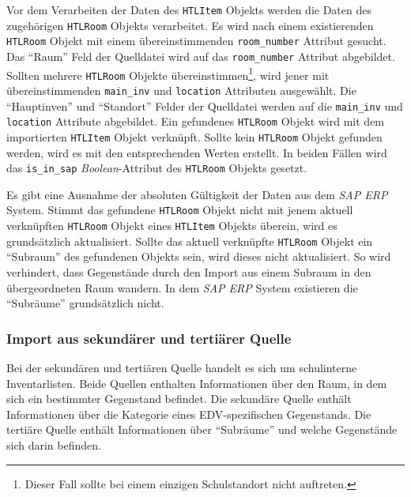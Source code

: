 Vor dem Verarbeiten der Daten des \texttt{HTLItem} Objekts werden die
Daten des zugehörigen \texttt{HTLRoom} Objekts verarbeitet. Es wird nach
einem existierenden \texttt{HTLRoom} Objekt mit einem übereinstimmenden
\texttt{room\_number} Attribut gesucht. Das ``Raum'' Feld der Quelldatei
wird auf das \texttt{room\_number} Attribut abgebildet. Sollten mehrere
\texttt{HTLRoom} Objekte übereinstimmen\footnote{Dieser Fall sollte bei
  einem einzigen Schulstandort nicht auftreten.}, wird jener mit
übereinstimmenden \texttt{main\_inv} und \texttt{location} Attributen
ausgewählt. Die ``Hauptinven'' und ``Standort'' Felder der Quelldatei
werden auf die \texttt{main\_inv} und \texttt{location} Attribute
abgebildet. Ein gefundenes \texttt{HTLRoom} Objekt wird mit dem
importierten \texttt{HTLItem} Objekt verknüpft. Sollte kein
\texttt{HTLRoom} Objekt gefunden werden, wird es mit den entsprechenden
Werten erstellt. In beiden Fällen wird das \texttt{is\_in\_sap}
\emph{Boolean}-Attribut
des \texttt{HTLRoom} Objekts gesetzt.

Es gibt eine Ausnahme der absoluten Gültigkeit der Daten aus dem
\emph{SAP ERP}
System. Stimmt das gefundene \texttt{HTLRoom} Objekt nicht mit jenem
aktuell verknüpften \texttt{HTLRoom} Objekt eines \texttt{HTLItem}
Objekts überein, wird es grundsätzlich aktualisiert. Sollte das aktuell
verknüpfte \texttt{HTLRoom} Objekt ein ``Subraum'' des gefundenen
Objekts sein, wird dieses nicht aktualisiert. So wird verhindert, dass
Gegenstände durch den Import aus einem Subraum in den übergeordneten
Raum wandern. In dem \emph{SAP ERP}
System existieren die ``Subräume'' grundsätzlich nicht.

\hypertarget{import-aus-sekunduxe4rer-und-tertiuxe4rer-quelle}{%
\subsubsection{Import aus sekundärer und tertiärer
Quelle}\label{import-aus-sekunduxe4rer-und-tertiuxe4rer-quelle}}

Bei der sekundären und tertiären Quelle handelt es sich um schulinterne
Inventarlisten. Beide Quellen enthalten Informationen über den Raum, in
dem sich ein bestimmter Gegenstand befindet. Die sekundäre Quelle
enthält Informationen über die Kategorie eines EDV-spezifischen
Gegenstands. Die tertiäre Quelle enthält Informationen über ``Subräume''
und welche Gegenstände sich darin befinden.

